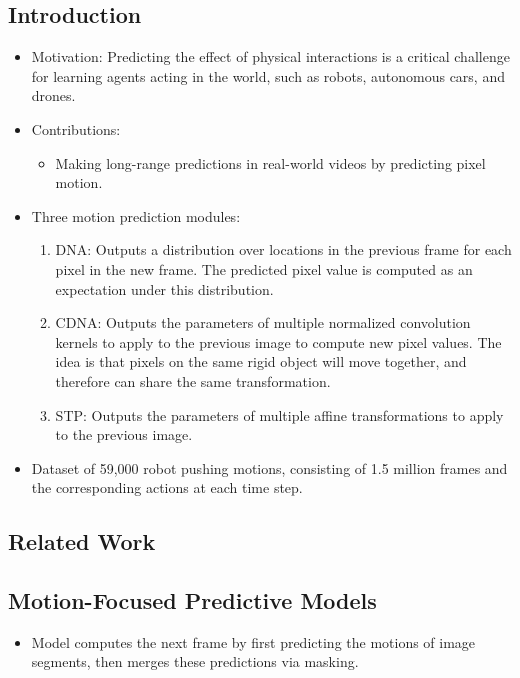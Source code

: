 \documentclass{article}
\begin{document}
    \subsection{Introduction}\label{subsec:Unsupervised_Learning_for_Physical_Interaction_through_Video_Prediction:introduction}
    \begin{itemize}
        \item Motivation: Predicting the effect of physical interactions is a critical challenge for learning agents acting in the world, such as robots, autonomous cars, and drones.
        \item Contributions:
        \begin{itemize}
            \item Making long-range predictions in real-world videos by predicting pixel motion.
        \end{itemize}
        \item Three motion prediction modules:
        \begin{enumerate}
            \itemsep0em
            \item DNA: Outputs a distribution over locations in the previous frame for each pixel in the new frame.
            The predicted pixel value is computed as an expectation under this distribution.
            \item CDNA: Outputs the parameters of multiple normalized convolution kernels to apply to the previous image to compute new pixel values.
            The idea is that pixels on the same rigid object will move together, and therefore can share the same transformation.
            \item STP: Outputs the parameters of multiple affine transformations to apply to the previous image.
        \end{enumerate}
        \item Dataset of 59,000 robot pushing motions, consisting of 1.5 million frames and the corresponding actions at each time step.
    \end{itemize}

    \subsection{Related Work}\label{subsec:Unsupervised_Learning_for_Physical_Interaction_through_Video_Prediction:related-work}

    \subsection{Motion-Focused Predictive Models}\label{subsec:Unsupervised_Learning_for_Physical_Interaction_through_Video_Prediction:motion-focused-predictive-models}
    \begin{itemize}
        \item Model computes the next frame by first predicting the motions of image segments, then merges these predictions via masking.
    \end{itemize}
\end{document}

